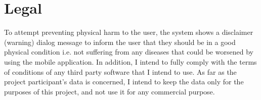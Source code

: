     
    \section{Legal}
    To attempt preventing physical harm to the user, the system shows a disclaimer (warning) dialog message to inform the user that they should be in a good physical condition i.e. not suffering from any diseases that could be worsened by using the mobile application. In addition, I intend to fully comply with the terms of conditions of any third party software that I intend to use. As far as the project participant’s data is concerned, I intend to keep the data only for the purposes of this project, and not use it for any commercial purpose.